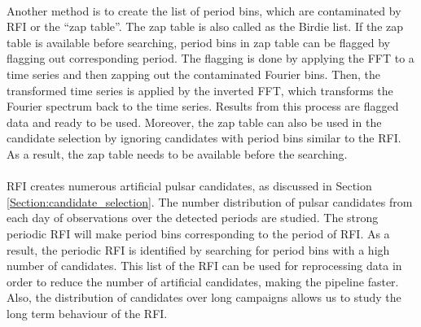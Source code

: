 \documentclass[thesis_msc.tex]{subfiles}
\begin{document}
     \paragraph{} Another method is to create the list of period bins, which are contaminated by RFI or the ``zap table''. The zap table is also called as the Birdie list. If the zap table is available before searching, period bins in zap table can be flagged by flagging out corresponding period. The flagging is done by applying the FFT to a time series and then zapping out the contaminated Fourier bins. Then, the transformed time series is applied by the inverted FFT, which transforms the Fourier spectrum back to the time series. Results from this process are flagged data and ready to be used. Moreover, the zap table can also be used in the candidate selection by ignoring candidates with period bins similar to the RFI. As a result, the zap table needs to be available before the searching. %
     
     \paragraph{} RFI creates numerous artificial pulsar candidates, as discussed in Section \ref{Section:candidate_selection}. The number distribution of pulsar candidates from each day of observations over the detected periods are studied. The strong periodic RFI will make period bins corresponding to the period of RFI. As a result, the periodic RFI is identified by searching for period bins with a high number of candidates. This list of the RFI can be used for reprocessing data in order to reduce the number of artificial candidates, making the pipeline faster. Also, the distribution of candidates over long campaigns allows us to study the long term behaviour of the RFI. 
\end{document}
